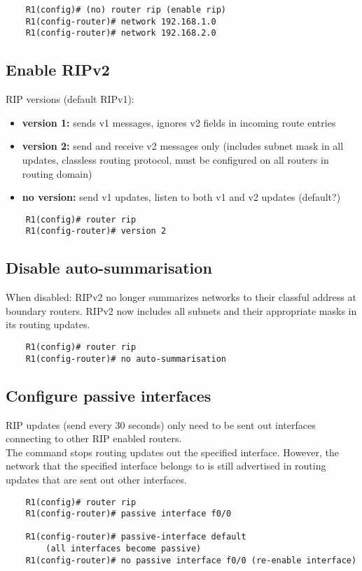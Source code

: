 \documentclass[10pt, a4paper]{article}
\begin{document}
	\begin{lstlisting}
	R1(config)# (no) router rip (enable rip)
	R1(config-router)# network 192.168.1.0
	R1(config-router)# network 192.168.2.0
	\end{lstlisting}
	
	\subsection{Enable RIPv2}
	RIP versions (default RIPv1):
	\begin{itemize}[noitemsep,nolistsep]
		\item \textbf{version 1:} sends v1 messages, ignores v2 fields in incoming route entries
		\item \textbf{version 2:} send and receive v2 messages only (includes subnet mask in all updates, classless routing protocol, must be configured on all routers in routing domain)
		\item \textbf{no version:} send v1 updates, listen to both v1 and v2 updates (default?)\\
	\end{itemize}
	\begin{lstlisting}
	R1(config)# router rip
	R1(config-router)# version 2
	\end{lstlisting}
	
	\subsection{Disable auto-summarisation}
	When disabled: RIPv2 no longer summarizes networks to their classful address at boundary routers. RIPv2 now includes all subnets and their appropriate masks in its routing updates.\\
	\begin{lstlisting}
	R1(config)# router rip
	R1(config-router)# no auto-summarisation
	\end{lstlisting}
	
	\subsection{Configure passive interfaces}
	RIP updates (send every 30 seconds) only need to be sent out interfaces connecting to other RIP enabled routers.\\
	The command stops routing updates out the specified interface. However, the network that the specified interface belongs to is still advertised in routing updates that are sent out other interfaces.\\
	\begin{lstlisting}
	R1(config)# router rip
	R1(config-router)# passive interface f0/0
	
	R1(config-router)# passive-interface default 
		(all interfaces become passive)
	R1(config-router)# no passive interface f0/0 (re-enable interface)
	\end{lstlisting}
	
\end{document}
